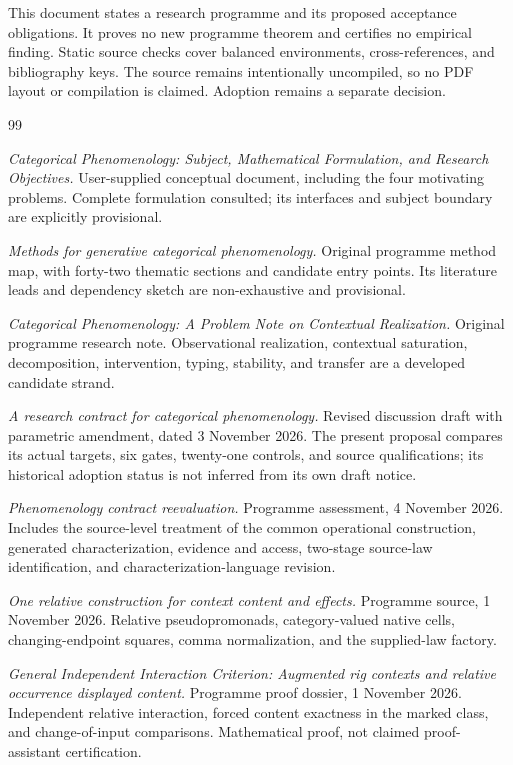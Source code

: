 \documentclass[11pt]{article}
\theoremstyle{definition}
\begin{document}
This document states a research programme and its proposed acceptance obligations. It proves no new programme theorem and certifies no empirical finding. Static source checks cover balanced environments, cross-references, and bibliography keys. The source remains intentionally uncompiled, so no PDF layout or compilation is claimed. Adoption remains a separate decision.

\begin{thebibliography}{99}

\emph{Categorical Phenomenology: Subject, Mathematical Formulation, and Research Objectives.}
User-supplied conceptual document, including the four motivating problems. Complete formulation consulted; its interfaces and subject boundary are explicitly provisional.

\emph{Methods for generative categorical phenomenology.}
Original programme method map, with forty-two thematic sections and candidate entry points. Its literature leads and dependency sketch are non-exhaustive and provisional.

\emph{Categorical Phenomenology: A Problem Note on Contextual Realization.}
Original programme research note. Observational realization, contextual saturation, decomposition, intervention, typing, stability, and transfer are a developed candidate strand.

\emph{A research contract for categorical phenomenology.}
Revised discussion draft with parametric amendment, dated 3 November 2026. The present proposal compares its actual targets, six gates, twenty-one controls, and source qualifications; its historical adoption status is not inferred from its own draft notice.

\emph{Phenomenology contract reevaluation.}
Programme assessment, 4 November 2026. Includes the source-level treatment of the common operational construction, generated characterization, evidence and access, two-stage source-law identification, and characterization-language revision.

\emph{One relative construction for context content and effects.}
Programme source, 1 November 2026. Relative pseudopromonads, category-valued native cells, changing-endpoint squares, comma normalization, and the supplied-law factory.

\emph{General Independent Interaction Criterion: Augmented rig contexts and relative occurrence displayed content.}
Programme proof dossier, 1 November 2026. Independent relative interaction, forced content exactness in the marked class, and change-of-input comparisons. Mathematical proof, not claimed proof-assistant certification.


\end{thebibliography}
\end{document}
